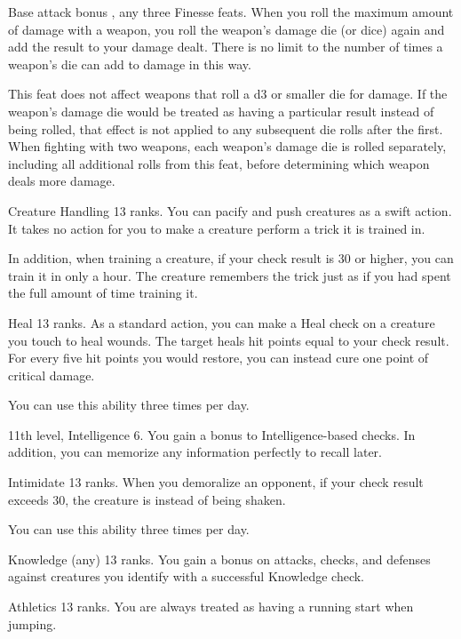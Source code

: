 \featpre Base attack bonus , any three Finesse feats.
\featben When you roll the maximum amount of damage with a weapon, you roll the weapon's damage die (or dice) again and add the result to your damage dealt. There is no limit to the number of times a weapon's die can add to damage in this way.

This feat does not affect weapons that roll a d3 or smaller die for damage. If the weapon's damage die would be treated as having a particular result instead of being rolled, that effect is not applied to any subsequent die rolls after the first. When fighting with two weapons, each weapon's damage die is rolled separately, including all additional rolls from this feat, before determining which weapon deals more damage.

\featpre Creature Handling 13 ranks.
\featben You can pacify and push creatures as a swift action. It takes no action for you to make a creature perform a trick it is trained in.

In addition, when training a creature, if your check result is 30 or higher, you can train it in only a hour. The creature remembers the trick just as if you had spent the full amount of time training it.

\featpre Heal 13 ranks.
\featben As a standard action, you can make a Heal check on a creature you touch to heal wounds. The target heals hit points equal to your check result. For every five hit points you would restore, you can instead cure one point of critical damage.

You can use this ability three times per day.

\featpre 11th level, Intelligence 6.
\featben You gain a  bonus to Intelligence-based checks. In addition, you can memorize any information perfectly to recall later.

\featpre Intimidate 13 ranks.
\featben When you demoralize an opponent, if your check result exceeds 30, the creature is \panicked instead of being shaken.

You can use this ability three times per day.

\featpre Knowledge (any) 13 ranks.
\featben You gain a  bonus on attacks, checks, and defenses against creatures you identify with a successful Knowledge check.

\featpre Athletics 13 ranks.
\featben You are always treated as having a running start when jumping.

